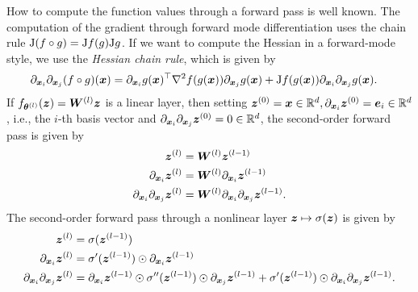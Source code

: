 How to compute the function values through a forward pass is well known.
The computation of the gradient through forward mode differentiation uses the chain rule $\mathrm{J} (f\circ g) = \mathrm{J} f (g) \mathrm{J} g$.
If we want to compute the Hessian in a forward-mode style, we use the \emph{Hessian chain rule}, which is given by
\begin{align}
       \partial_{{\bm{x}}_i} \partial_{{\bm{x}}_j} (f \circ g)({\bm{x}}) & = \partial_{{\bm{x}}_i} g({\bm{x}})^\top \nabla^2f(g({\bm{x}}))\partial_{{\bm{x}}_j} g({\bm{x}}) + \mathrm{J} f(g({\bm{x}})) \partial_{{\bm{x}}_i} \partial_{{\bm{x}}_j} g({\bm{x}}).
\end{align}
If $f_{\vtheta^{(l)}}(\vz) = \mW^{(l)} \vz %
$ is a linear layer, then setting ${\bm{z}}^{(0)} = {\bm{x}}\in\mathbb R^d, \partial_{{\bm{x}}_i}{\bm{z}}^{(0)} = {\bm{e}}_i\in\mathbb R^d$, i.e., the $i$-th basis vector and $\partial_{{\bm{x}}_i}\partial_{{\bm{x}}_j}{\bm{z}}^{(0)} = 0\in\mathbb R^d$, the second-order forward pass is given by
\begin{subequations}\label{eq:forward_pass}
    \begin{align}
    \vz^{(l)} & = \mW^{(l)} \vz^{(l-1)} %
    \\
    \partial_{\vx_i} \vz^{(l)} & = \mW^{(l)} \partial_{\vx_i} \vz^{(l-1)} \\
    \partial_{\vx_i}\partial_{\vx_j} \vz^{(l)} & = \mW^{(l)} \partial_{\vx_i}\partial_{\vx_j} \vz^{(l-1)} \label{subeq:secondOrderForward-LinearLayer}.
\end{align}
\end{subequations}
The second-order forward pass through a nonlinear layer ${\bm{z}}\mapsto \sigma({\bm{z}})$ is given by
\begin{subequations}
    \begin{align}
    {\bm{z}}^{(l)} & = \sigma({\bm{z}}^{(l-1)}) \\
    \partial_{{\bm{x}}_i} {\bm{z}}^{(l)} & = \sigma'({\bm{z}}^{(l-1)}) \odot \partial_{{\bm{x}}_i} {\bm{z}}^{(l-1)} \\
    \partial_{{\bm{x}}_i}\partial_{{\bm{x}}_j} {\bm{z}}^{(l)} & = \partial_{{\bm{x}}_i} {\bm{z}}^{(l-1)} \odot \sigma''({\bm{z}}^{(l-1)}) \odot \partial_{{\bm{x}}_j} {\bm{z}}^{(l-1)} + \sigma'({\bm{z}}^{(l-1)}) \odot \partial_{{\bm{x}}_i} \partial_{{\bm{x}}_j} {\bm{z}}^{(l-1)} \label{subeq:secondOrderForward-nonlinearLayer}.
\end{align}
\end{subequations}



